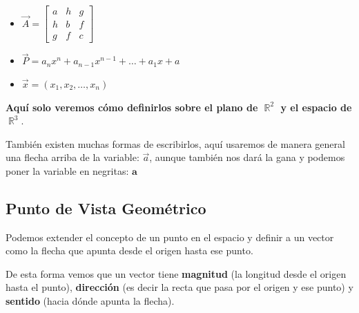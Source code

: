 \documentclass[12pt, fleqn]{report}                             %
\theoremstyle{break}                                            %
\DeclareMathOperator \Reals        {\mathbb{R}}                 %
\newcommand{\bVec}[1]   {\mathbf{#1}}                           %
\newcommand{\bVector}[1]                                        %
        { \ensuremath{\begin{bmatrix}#1\end{bmatrix}} }             %
\begin{document}
                \begin{itemize}
                    
                    \item 
                        $
                        \vec{A} = \bVector{
                            a & h & g           \\
                            h & b & f           \\
                            g & f & c}
                        $

                    \item
                        $
                        \vec{P} = a_n x^n + a_{n-1} x^{n-1} + \dots + a_1 x + a     
                        $
                    
                    \item
                        $
                        \vec{x} = (x_1, x_2, \dots, x_n)
                        $

                \end{itemize}
  
            \textbf{Aquí solo veremos cómo definirlos sobre el plano de $\Reals^2$ y el espacio de $\Reals^3$}.

            También existen muchas formas de escribirlos, aquí usaremos de manera general una flecha
            arriba de la variable: $\vec{a}$, aunque también nos dará la gana y podemos poner la
            variable en negritas: $\bVec{a}$

            \subsection{Punto de Vista Geométrico}
            
                Podemos extender el concepto de un punto en el espacio y definir a un vector
                como la flecha que apunta desde el origen hasta ese punto.

                De esta forma vemos que un vector tiene \textbf{magnitud} (la longitud desde
                el origen hasta el punto), \textbf{dirección} (es decir la recta que pasa por
                el origen y ese punto) y \textbf{sentido} (hacia dónde apunta la flecha).
                
\end{document}
